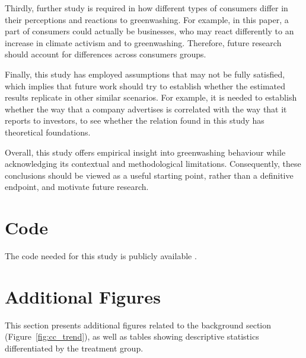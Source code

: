 \documentclass[12pt]{article}
\begin{document}
Thirdly, further study is required in how different types of consumers differ in their perceptions and reactions to greenwashing. For example, in this paper, a part of consumers could actually be businesses, who may react differently to an increase in climate activism and to greenwashing. Therefore, future research should account for differences across consumers groups. 

Finally, this study has employed assumptions that may not be fully satisfied, which implies that future work should try to establish whether the estimated results replicate in other similar scenarios. For example, it is needed to establish whether the way that a company advertises is correlated with the way that it reports to investors, to see whether the relation found in this study has theoretical foundations. 

Overall, this study offers empirical insight into greenwashing behaviour while acknowledging its contextual and methodological limitations. Consequently, these conclusions should be viewed as a useful starting point, rather than a definitive endpoint, and motivate future research.



\pagebreak
\printbibliography{}
\pagebreak
\appendix

\section{Code}

The code needed for this study is publicly available \href{https://github.com/pszewi/thesis}{}.

\renewcommand\thetable{\thesection.\arabic{table}}
\renewcommand\thefigure{\thesection.\arabic{figure}}
\setcounter{table}{0}
\setcounter{figure}{0}

\section{Additional Figures}\label{app:extra_figs}



This section presents additional figures related to the background section (Figure~\ref{fig:cc_trend}), as well as tables showing descriptive statistics differentiated by the treatment group.
\end{document}
